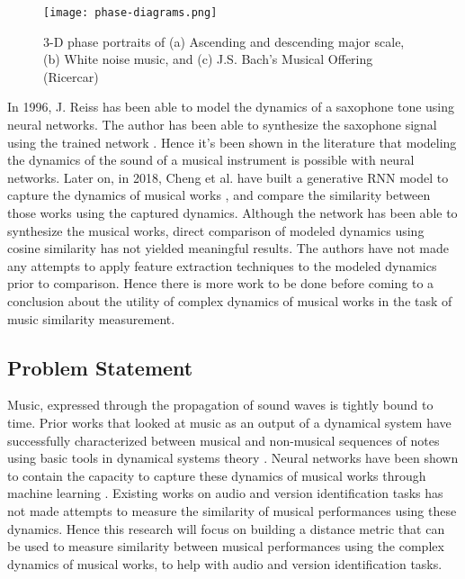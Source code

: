 \documentclass[../main.tex]{subfiles}
\begin{document}
\begin{figure}[h]
    \centering
    \texttt{[image: phase-diagrams.png]}
    \caption{3-D phase portraits of (a) Ascending and descending major scale, (b) White noise music, and (c) J.S. Bach's Musical Offering (Ricercar)}
    \label{fig:phase-diagrams}
\end{figure}

\par
In 1996, J. Reiss has been able to model the dynamics of a saxophone tone using neural networks. The author has been able to synthesize the saxophone signal using the trained network \cite{robelNeuralNetworkModeling1997}. Hence it's been shown in the literature that modeling the dynamics of the sound of a musical instrument is possible with neural networks. Later on, in 2018, Cheng et al. have built a generative \gls{RNN} model to capture the dynamics of musical works  \cite{tian_cheng_comparing_2018}, and compare the similarity between those works using the captured dynamics. Although the network has been able to synthesize the musical works, direct comparison of modeled dynamics using cosine similarity has not yielded meaningful results. The authors have not made any attempts to apply feature extraction techniques to the modeled dynamics prior to comparison. Hence there is more work to be done before coming to a conclusion about the utility of complex dynamics of musical works in the task of music similarity measurement.


\subsection{Problem Statement}

\par
Music, expressed through the propagation of sound waves is tightly bound to time. Prior works that looked at music as an output of a dynamical system have successfully characterized between musical and non-musical sequences of notes using basic tools in dynamical systems theory \cite{complex_dynamics}. Neural networks have been shown to contain the capacity to capture these dynamics of musical works through machine learning \cite{robelNeuralNetworkModeling1997,dynamic_process_modeling_with_rnn}. Existing works on audio and version identification tasks has not made attempts to measure the similarity of musical performances using these dynamics. Hence this research will focus on building a distance metric that can be used to measure similarity between musical performances using the complex dynamics of musical works, to help with audio and version identification tasks.
\end{document}
